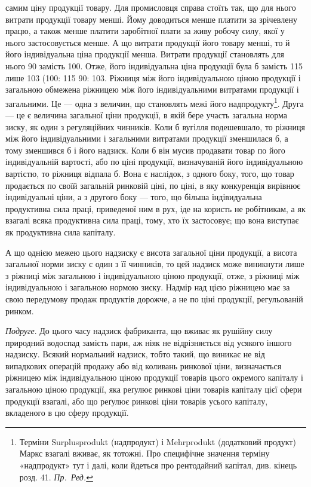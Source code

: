 \parcont{}  %
самим ціну продукції товару. Для промисловця справа стоїть так, що для нього
витрати продукції товару менші. Йому доводиться менше платити за зрічевлену
працю, а також менше платити заробітної плати за живу робочу силу, якої
у нього застосовується менше. А що витрати продукції його товару менші,
то й його індивідуальна ціна продукції менша. Витрати продукції становлять для
нього 90 замість 100. Отже, його індивідуальна ціна продукції була б замість
115 лише 103 (100: 115 \deq{} 90: 103. Ріжниця між його індивідуальною ціною
продукції і загальною обмежена ріжницею між його індивідуальними витратами
продукції і загальними. Це — одна з величин, що становлять межі його надпродукту\footnote{Терміни Surplusprodukt (надпродукт) і Mehrprodukt (додатковий продукт) Маркс взагалі вживає,
як тотожні. Про специфічне значення терміну «надпродукт» тут і далі, коли йдеться
про рентодайний капітал, див. кінець розд. 41. \emph{Пр.~Ред.}}. Друга — це є величина загальної ціни продукції, в якій бере участь
загальна норма зиску, як один з регуляційних чинників. Коли б вугілля подешевшало,
то ріжниця між його індивідуальними і загальними витратами продукції
зменшилася б, а тому зменшився б і його надзиск. Коли б він мусив продавати
товар по його індивідуальній вартості, або по ціні продукції, визначуваній
його індивідуальною вартістю, то ріжниця відпала б. Вона є наслідок, з одного
боку, того, що товар продається по своїй загальній ринковій ціні, по ціні,
в яку конкуренція вирівнює індивідуальні ціни, а з другого боку — того, що
більша індівидуальна продуктивна сила праці, приведеної ним в рух, іде на користь
не робітникам, а як взагалі всяка продуктивна сила праці, тому, хто їх
застосовує; що вона виступає як продуктивна сила капіталу.

А що однією межею цього надзиску є висота загальної ціни продукції,
а висота загальної норми зиску є один з її чинників, то цей надзиск може
виникнути лише з ріжниці між загальною і індивідуальною ціною продукції,
отже, з ріжниці між індивідуальною і загальною нормою зиску. Надмір над цією
ріжницею має за свою передумову продаж продуктів дорожче, а не по ціні
продукції, регульованій ринком.

\emph{Подруге}. До цього часу надзиск фабриканта, що вживає як рушійну силу
природний водоспад замість пари, аж ніяк не відрізняється від усякого іншого
надзиску. Всякий нормальний надзиск, тобто такий, що виникає не від випадкових
операцій продажу або від коливань ринкової ціни, визначається ріжницею між
індивідуальною ціною продукції товарів цього окремого капіталу і загальною
ціною продукції, яка реґулює ринкові ціни товарів капіталу цієї сфери продукції
взагалі, або що реґулює ринкові ціни товарів усього капіталу, вкладеного в цю
сферу продукції.

